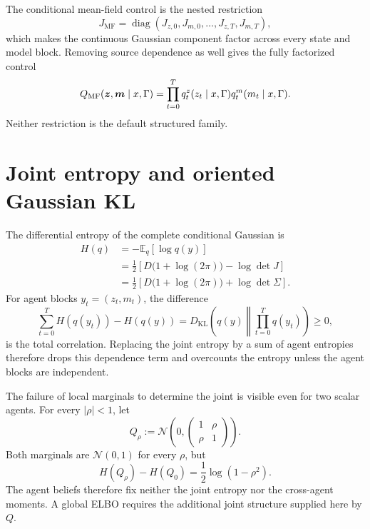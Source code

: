 The conditional mean-field control is the nested restriction
\begin{equation}
J_{\mathrm{MF}}
=\operatorname{diag}
(J_{z,0},J_{m,0},\ldots,J_{z,T},J_{m,T}),
\label{eq:mean-field-information-restriction}
\end{equation}
which makes the continuous Gaussian component factor across every state and model block.  Removing source dependence as well gives the fully factorized control
\begin{equation}
Q_{\mathrm{MF}}(\boldsymbol z,\boldsymbol m\mid x,\Gamma)
=\prod_{t=0}^{T}
q_t^z(z_t\mid x,\Gamma)
q_t^m(m_t\mid x,\Gamma).
\label{eq:full-mean-field-control}
\end{equation}
Neither restriction is the default structured family.

\section{Joint entropy and oriented Gaussian KL}

The differential entropy of the complete conditional Gaussian is
\begin{equation}
\begin{aligned}
H(q)
&=-\mathbb E_q[\log q(y)]\\
&=\frac12
\left[
D\bigl(1+\log(2\pi)\bigr)-\log\det J
\right]\\
&=\frac12
\left[
D\bigl(1+\log(2\pi)\bigr)+\log\det\Sigma
\right].
\end{aligned}
\label{eq:full-joint-gaussian-entropy}
\end{equation}
For agent blocks $y_t=(z_t,m_t)$, the difference
\begin{equation}
\sum_{t=0}^{T}H(q(y_t))-H(q(y))
=D_{\mathrm{KL}}
\left(
q(y)\middle\Vert\prod_{t=0}^{T}q(y_t)
\right)
\geq0,
\label{eq:gaussian-total-correlation}
\end{equation}
is the total correlation. Replacing the joint entropy by a sum of agent entropies therefore drops this dependence term and overcounts the entropy unless the agent blocks are independent.

The failure of local marginals to determine the joint is visible even for two scalar agents. For every $|\rho|<1$, let
\begin{equation}
Q_\rho
:=\mathcal N\left(
0,
\begin{pmatrix}1&\rho\\\rho&1\end{pmatrix}
\right).
\label{eq:fixed-marginals-varying-correlation-example}
\end{equation}
Both marginals are $\mathcal N(0,1)$ for every $\rho$, but
\begin{equation}
H(Q_\rho)-H(Q_0)
=\frac12\log(1-\rho^2).
\label{eq:fixed-marginals-varying-entropy}
\end{equation}
The agent beliefs therefore fix neither the joint entropy nor the cross-agent moments. A global ELBO requires the additional joint structure supplied here by $Q$.

